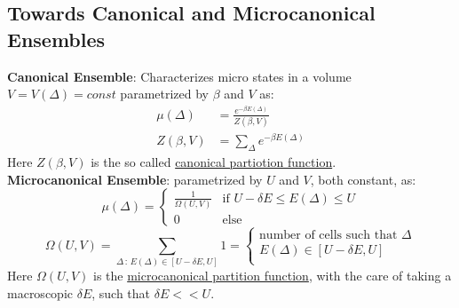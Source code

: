 \documentclass{article}
\begin{document}
\subsection{Towards Canonical and Microcanonical Ensembles}
\textbf{Canonical Ensemble}: Characterizes micro states in a volume $V=V(\Delta) = const$ parametrized by $\beta$ and $V$ as:
\begin{equation*}
    \begin{aligned}
         \mu(\Delta) &= \frac{e^{-\beta E(\Delta)}}{Z(\beta,V)} \\
        Z(\beta,V) &= \sum_{\Delta} e^{-\beta E(\Delta)}
    \end{aligned}
\end{equation*}
Here $Z(\beta,V)$ is the so called \underline{canonical partiotion function}.\\
\newline
\textbf{Microcanonical Ensemble}: parametrized by $U$ and $V$, both constant, as:
\[
\mu(\Delta) = \begin{cases} \frac{1}{\Omega(U,V)} & \mbox{if } U-\delta E \leq E(\Delta)\leq U  \\
0 & \mbox{else} \end{cases}
\]
\[
\Omega(U,V) = \sum_{\Delta\, : \, E(\Delta) \in [U-\delta E,U] } 1 = \begin{cases} \mbox{number of cells such that } \Delta \\
E(\Delta) \in [U-\delta E,U]\\
\end{cases}
\]
Here $\Omega(U,V)$ is the \underline{microcanonical partition function}, with the care of taking a macroscopic $\delta E$, such that $\delta E << U$. \\
\end{document}
